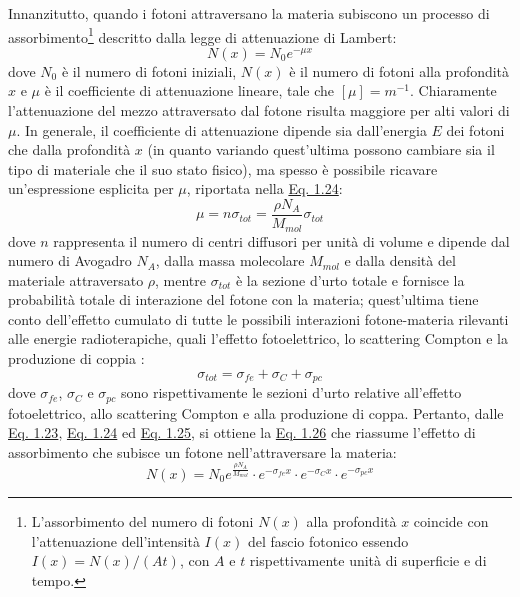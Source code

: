\documentclass[12pt,a4paper,twoside]{report}
\begin{document}
	Innanzitutto, quando i fotoni attraversano la materia subiscono un processo di assorbimento\footnote{L'assorbimento del numero di fotoni $N(x)$ alla profondità $x$ coincide con l'attenuazione dell'intensità $I(x)$ del fascio fotonico essendo $I(x)=N(x)/(At)$, con $A$ e $t$ rispettivamente unità di superficie e di tempo.} descritto dalla legge di attenuazione di Lambert:
	\begin{equation}
		N(x)=N_0e^{-\mu x}
		\label{eq:lambert}
	\end{equation}
	dove $N_0$ è il numero di fotoni iniziali, $N(x)$ è il numero di fotoni alla profondità $x$ e $\mu$ è il coefficiente di attenuazione lineare, tale che $\left[\mu\right]=m^{-1}$. Chiaramente l'attenuazione del mezzo attraversato dal fotone risulta maggiore per alti valori di $\mu$. In generale, il coefficiente di attenuazione dipende sia dall'energia $E$ dei fotoni che dalla profondità $x$ (in quanto variando quest'ultima possono cambiare sia il tipo di materiale che il suo stato fisico), ma spesso è possibile ricavare un'espressione esplicita per $\mu$, riportata nella \hyperref[eq:attenuazione]{Eq. 1.24}:
	\begin{equation}
		\mu=n\sigma_{tot}=\frac{\rho N_A}{M_{mol}}\sigma_{tot}
		\label{eq:attenuazione}
	\end{equation}
	dove $n$ rappresenta il numero di centri diffusori per unità di volume e dipende dal numero di Avogadro $N_A$, dalla massa molecolare $M_{mol}$ e dalla densità del materiale attraversato $\rho$, mentre $\sigma_{tot}$ è la sezione d'urto totale e fornisce la probabilità totale di interazione del fotone con la materia; quest'ultima tiene conto dell'effetto cumulato di tutte le possibili interazioni fotone-materia rilevanti alle energie radioterapiche, quali l'effetto fotoelettrico, lo scattering Compton e la produzione di coppia \cite{testaNotes}:
	\begin{equation}
		\sigma_{tot}=\sigma_{fe}+\sigma_{C}+\sigma_{pc}
		\label{eq:sum_cross_section}
	\end{equation}
	dove $\sigma_{fe}$, $\sigma_{C}$ e $\sigma_{pc}$ sono rispettivamente le sezioni d'urto relative all'effetto fotoelettrico, allo scattering Compton e alla produzione di coppa. Pertanto, dalle \hyperref[eq:lambert]{Eq. 1.23}, \hyperref[eq:attenuazione]{Eq. 1.24} ed \hyperref[eq:sum_cross_section]{Eq. 1.25}, si ottiene la \hyperref[eq:photon_absorption]{Eq. 1.26} che riassume l'effetto di assorbimento che subisce un fotone nell'attraversare la materia:
	\begin{equation}
		N(x)=N_0e^{\frac{\rho N_A}{M_{mol}}}\cdot e^{-\sigma_{fe}x}\cdot e^{-\sigma_{C}x}\cdot e^{-\sigma_{pc}x}
		\label{eq:photon_absorption}
	\end{equation}
	
\end{document}
